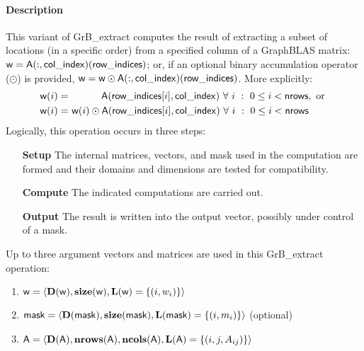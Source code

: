 \paragraph{Description}

This variant of {\sf GrB\_extract} computes the result of extracting a subset of
locations (in a specific order) from a specified column of a GraphBLAS matrix: 
${\sf w} = {\sf A}(:,{\sf col\_index})({\sf row\_indices})$; or, if an 
optional binary accumulation operator ($\odot$) is provided, 
${\sf w} = {\sf w} \odot {\sf A}(:,{\sf col\_index})({\sf row\_indices})$.  
More explicitly:
\[
\begin{aligned}
    {\sf w}(i) = &\ \ \ \ \ \ \ \ \ \ {\sf A}({\sf row\_indices}[i],{\sf col\_index}) 
    \ \forall \ i \ : \ 0 \leq i < {\sf nrows}, \mbox{~or~}
    \\
    {\sf w}(i) = &\ {\sf w}(i) \odot {\sf A}({\sf row\_indices}[i],{\sf col\_index})
    \ \forall \ i \ : \ 0 \leq i < {\sf nrows}
\end{aligned}
\]  
Logically, this operation occurs in three steps:
\begin{enumerate}[leftmargin=0.75in]
\item[\bf Setup] The internal matrices, vectors, and mask used in the computation are formed 
and their domains and dimensions are tested for compatibility.
\item[\bf Compute] The indicated computations are carried out.
\item[\bf Output] The result is written into the output vector, possibly under 
control of a mask.
\end{enumerate}

Up to three argument vectors and matrices are used in this {\sf GrB\_extract} 
operation:
\begin{enumerate}
	\item ${\sf w} = \langle \bold{D}({\sf w}),\bold{size}({\sf w}),
    \bold{L}({\sf w}) = \{(i,w_{i}) \} \rangle$
    
	\item ${\sf mask} = \langle \bold{D}({\sf mask}),\bold{size}({\sf mask}),
    \bold{L}({\sf mask}) = \{(i,m_{i}) \} \rangle$ (optional)

	\item ${\sf A} = \langle \bold{D}({\sf A}),\bold{nrows}({\sf A}),
    \bold{ncols}({\sf A}),\bold{L}({\sf A}) = \{(i,j,A_{ij}) \} \rangle$
\end{enumerate}


